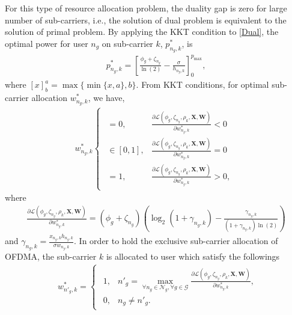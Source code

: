 \documentclass[journal,draftclsnofoot,12pt,onecolumn]{IEEEtran}
\begin{document}
{For this type of resource allocation problem, the duality gap is zero for large number of sub-carriers, i.e., the solution of dual problem is equivalent to the solution of primal problem\cite{4472014,1658226}}. By applying the KKT condition to \eqref{Dual}, the optimal power for user $n_g$ on sub-carrier $k$, $p^*_{n_g,k}$, is
\begin{align}\label{power}
p^*_{n_g,k} = \left[\frac{\phi_g + \zeta_{n_g}}{\ln(2)} - \frac{\sigma}{h_{n_g,k}} \right]^{p_\text{max}}_0,
\end{align}
where $[x]^a_b = \max\{\min\{x,a\},b\}$. From KKT conditions, for optimal sub-carrier allocation $w_{n_g,k}^{*}$, we have,
\begin{align}
w_{n_g,k}^{*}
\begin{cases}
\begin{array}{ll}
=0, & \frac{\partial \mathcal{L}(\phi_g,\zeta_{n_g},\rho_{k},\textbf{X},\textbf{W})}{\partial w_{n_g,k}^{*}} < 0 \\
\in [0,1], &\frac{\partial \mathcal{L}(\phi_g,\zeta_{n_g},\rho_{k},\textbf{X},\textbf{W})}{\partial w_{n_g,k}^{*}} = 0\nonumber \\
= 1, &\frac{\partial \mathcal{L}(\phi_g,\zeta_{n_g},\rho_{k},\textbf{X},\textbf{W})}{\partial w_{n_g,k}^{*}} > 0,
\end{array}
\end{cases}
\end{align}
where
\begin{align}
\frac{\partial \mathcal{L}(\phi_g,\zeta_{n_g},\rho_{k},\textbf{X},\textbf{W})}{\partial w_{n_g,k}^{*}} = (\phi_g + \zeta_{n_g})\left( \log_2(1 + \gamma_{n_g,k})- \frac{\gamma_{n_g,k}}{(1+\gamma_{n_g,k})\ln(2)}\right)\nonumber
\end{align}
and $\gamma_{n_g,k} = \frac{x_{n_g,k}h_{n_g,k}}{\sigma w_{n_g,k}}$. {In order to hold} the exclusive sub-carrier allocation of OFDMA, the sub-carrier $k$ is allocated to user which satisfy the followings
\begin{align}\label{subcarrier}
&w_{n'_g,k}^{*} = 
\begin{cases}
\begin{array}{ll}
1, & n'_g =\max_{\forall n_g\in \mathcal{N}_g, \forall g \in \mathcal{G}}\frac{\partial \mathcal{L}(\phi_g,\zeta_{n_g},\rho_{k},\textbf{X},\textbf{W})}{\partial w_{n_g,k}^{*}}, \\
0, & n_g \neq n'_g.
\end{array}
\end{cases}
\end{align}
\end{document}
